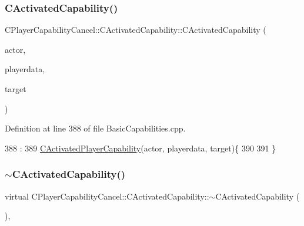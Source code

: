 \subsubsection{\texorpdfstring{C\+Activated\+Capability()}{CActivatedCapability()}}
{\footnotesize\ttfamily C\+Player\+Capability\+Cancel\+::\+C\+Activated\+Capability\+::\+C\+Activated\+Capability (\begin{DoxyParamCaption}\item[{std\+::shared\+\_\+ptr$<$ \hyperlink{classCPlayerAsset}{C\+Player\+Asset} $>$}]{actor,  }\item[{std\+::shared\+\_\+ptr$<$ \hyperlink{classCPlayerData}{C\+Player\+Data} $>$}]{playerdata,  }\item[{std\+::shared\+\_\+ptr$<$ \hyperlink{classCPlayerAsset}{C\+Player\+Asset} $>$}]{target }\end{DoxyParamCaption})}



Definition at line 388 of file Basic\+Capabilities.\+cpp.


\begin{DoxyCode}
388                                                                                                            
                                                                               :
389 \hyperlink{classCActivatedPlayerCapability_a1ece00ffb6a7b925c84dd94a7407a0d1}{CActivatedPlayerCapability}(actor, playerdata, target)\{
390 
391 \}
\end{DoxyCode}
\hypertarget{classCPlayerCapabilityCancel_1_1CActivatedCapability_ae0d7d8f36d4ac21c04d68dc6ad2ae9c4}{}\label{classCPlayerCapabilityCancel_1_1CActivatedCapability_ae0d7d8f36d4ac21c04d68dc6ad2ae9c4} 
\subsubsection{\texorpdfstring{$\sim$\+C\+Activated\+Capability()}{~CActivatedCapability()}}
{\footnotesize\ttfamily virtual C\+Player\+Capability\+Cancel\+::\+C\+Activated\+Capability\+::$\sim$\+C\+Activated\+Capability (\begin{DoxyParamCaption}{ }\end{DoxyParamCaption})\hspace{0.3cm}{\ttfamily [inline]}, {\ttfamily [virtual]}}



